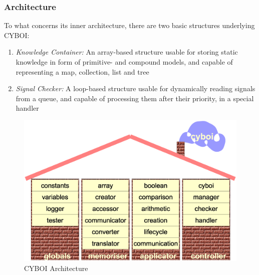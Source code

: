 %
%
%
%
%
%
%

\subsubsection{Architecture}
\label{architecture_heading}

To what concerns its inner architecture, there are two basic structures
underlying CYBOI:

\begin{enumerate}
    \item \emph{Knowledge Container:} An array-based structure usable for
        storing static knowledge in form of primitive- and compound models, and
        capable of representing a map, collection, list and tree
    \item \emph{Signal Checker:} A loop-based structure usable for dynamically
        reading signals from a queue, and capable of processing them after
        their priority, in a special handler
\end{enumerate}

\begin{figure}[ht]
    \begin{center}
        \includegraphics[scale=0.2]{vector/architecture.eps}
        \caption{CYBOI Architecture}
        \label{architecture_figure}
    \end{center}
\end{figure}

